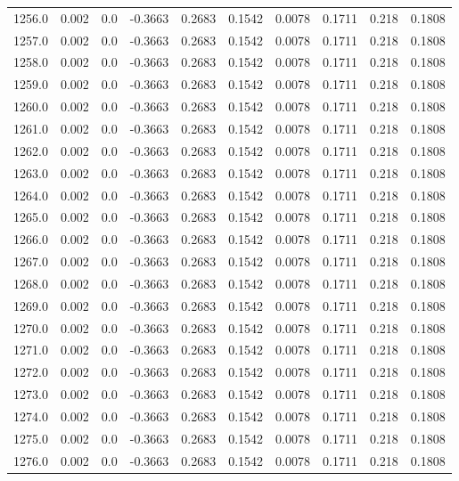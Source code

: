 \begin{longtable}{lrrrrrrrrr}
1256.0 & 0.002 & 0.0 & -0.3663 & 0.2683 & 0.1542 & 0.0078 & 0.1711 & 0.218 & 0.1808 \\
1257.0 & 0.002 & 0.0 & -0.3663 & 0.2683 & 0.1542 & 0.0078 & 0.1711 & 0.218 & 0.1808 \\
1258.0 & 0.002 & 0.0 & -0.3663 & 0.2683 & 0.1542 & 0.0078 & 0.1711 & 0.218 & 0.1808 \\
1259.0 & 0.002 & 0.0 & -0.3663 & 0.2683 & 0.1542 & 0.0078 & 0.1711 & 0.218 & 0.1808 \\
1260.0 & 0.002 & 0.0 & -0.3663 & 0.2683 & 0.1542 & 0.0078 & 0.1711 & 0.218 & 0.1808 \\
1261.0 & 0.002 & 0.0 & -0.3663 & 0.2683 & 0.1542 & 0.0078 & 0.1711 & 0.218 & 0.1808 \\
1262.0 & 0.002 & 0.0 & -0.3663 & 0.2683 & 0.1542 & 0.0078 & 0.1711 & 0.218 & 0.1808 \\
1263.0 & 0.002 & 0.0 & -0.3663 & 0.2683 & 0.1542 & 0.0078 & 0.1711 & 0.218 & 0.1808 \\
1264.0 & 0.002 & 0.0 & -0.3663 & 0.2683 & 0.1542 & 0.0078 & 0.1711 & 0.218 & 0.1808 \\
1265.0 & 0.002 & 0.0 & -0.3663 & 0.2683 & 0.1542 & 0.0078 & 0.1711 & 0.218 & 0.1808 \\
1266.0 & 0.002 & 0.0 & -0.3663 & 0.2683 & 0.1542 & 0.0078 & 0.1711 & 0.218 & 0.1808 \\
1267.0 & 0.002 & 0.0 & -0.3663 & 0.2683 & 0.1542 & 0.0078 & 0.1711 & 0.218 & 0.1808 \\
1268.0 & 0.002 & 0.0 & -0.3663 & 0.2683 & 0.1542 & 0.0078 & 0.1711 & 0.218 & 0.1808 \\
1269.0 & 0.002 & 0.0 & -0.3663 & 0.2683 & 0.1542 & 0.0078 & 0.1711 & 0.218 & 0.1808 \\
1270.0 & 0.002 & 0.0 & -0.3663 & 0.2683 & 0.1542 & 0.0078 & 0.1711 & 0.218 & 0.1808 \\
1271.0 & 0.002 & 0.0 & -0.3663 & 0.2683 & 0.1542 & 0.0078 & 0.1711 & 0.218 & 0.1808 \\
1272.0 & 0.002 & 0.0 & -0.3663 & 0.2683 & 0.1542 & 0.0078 & 0.1711 & 0.218 & 0.1808 \\
1273.0 & 0.002 & 0.0 & -0.3663 & 0.2683 & 0.1542 & 0.0078 & 0.1711 & 0.218 & 0.1808 \\
1274.0 & 0.002 & 0.0 & -0.3663 & 0.2683 & 0.1542 & 0.0078 & 0.1711 & 0.218 & 0.1808 \\
1275.0 & 0.002 & 0.0 & -0.3663 & 0.2683 & 0.1542 & 0.0078 & 0.1711 & 0.218 & 0.1808 \\
1276.0 & 0.002 & 0.0 & -0.3663 & 0.2683 & 0.1542 & 0.0078 & 0.1711 & 0.218 & 0.1808 \\

\end{longtable}
